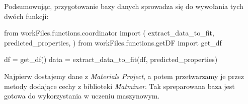\hspace{1.5cm} Podsumowując, przygotowanie bazy danych sprowadza się do wywołania tych dwóch funkcji:
\begin{pythoncode}
from workFiles.functions.coordinator import (
    extract_data_to_fit,
    predicted_properties,
)
from workFiles.functions.getDF import get_df

df = get_df()
data = extract_data_to_fit(df, predicted_properties)
\end{pythoncode}

\hspace{1.5cm} Najpierw dostajemy dane z \textit{Materials Project}, a potem przetwarzamy je przez metody dodające cechy z biblioteki \textit{Matminer}. Tak spreparowana baza jest gotowa do wykorzystania w uczeniu maszynowym.
